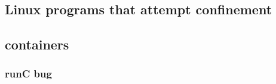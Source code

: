 
\subsection{Linux programs that attempt confinement}


\subsection{containers}



\subsubsection{runC bug}


